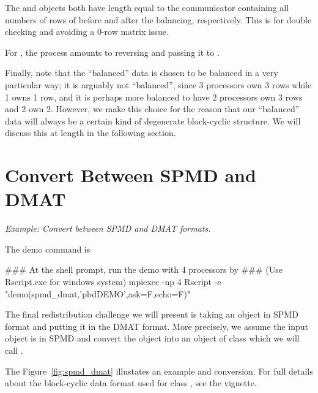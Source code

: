 The  and  objects both have length equal to the communicator containing all numbers of rows of  before and after the balancing, respectively. This is for double checking and avoiding a 0-row matrix issue.

For , the process amounts to reversing  and passing it to .

Finally, note that the ``balanced'' data is chosen to be balanced in a very particular way; it is arguably not ``balanced'', since 3 processors own 3 rows while 1 owns 1 row, and it is perhaps more balanced to have 2 processors own 3 rows and 2 own 2.  However, we make this choice for the reason that our ``balanced'' data will always be a certain kind of degenerate block-cyclic structure.  We will discuss this at length in the following section.




\section{Convert Between SPMD and DMAT}
\label{sec:spmd_dmat}

\emph{Example:  Convert between SPMD and DMAT formats.}

The demo command is
\begin{Command}
### At the shell prompt, run the demo with 4 processors by
### (Use Rscript.exe for windows system)
mpiexec -np 4 Rscript -e "demo(spmd_dmat,'pbdDEMO',ask=F,echo=F)"
\end{Command}

The final redistribution challenge we will present is taking an object in SPMD format and putting it in the DMAT format.  More precisely, we assume the input object  is in SPMD and convert the object into an object of class  which we will call .


The Figure~\ref{fig:spmd_dmat} illustates an example  and  conversion.  For full details about the block-cyclic data format used for class , see the  vignette.  

